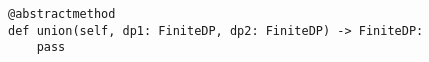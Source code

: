 \par\begin{minipage}{60ex}
\begin{verbatim}
@abstractmethod
def union(self, dp1: FiniteDP, dp2: FiniteDP) -> FiniteDP:
    pass
\end{verbatim}
\end{minipage}\par